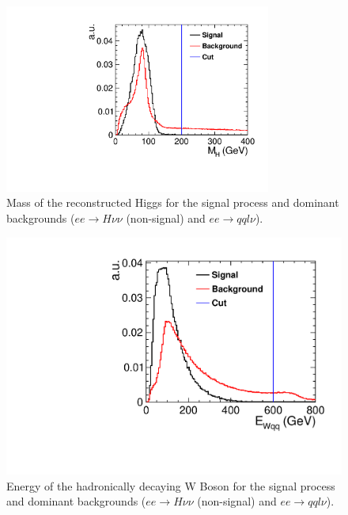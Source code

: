 \begin{figure}
  \centering
  \includegraphics[width=0.78\textwidth,keepaspectratio]{HiggsAnalysis/figures/PseudoHiggs_PreSelection}
  \caption[Reconstructed Higgs mass for signal and background events]{Mass of the reconstructed Higgs for the signal process and dominant backgrounds ($ee\rightarrow H\nu\nu$ (non-signal) and $ee\rightarrow qql\nu$).}
  \label{fig:HMassPreSel}
\end{figure}

\begin{figure}
  \centering
    \includegraphics[width=0.78\linewidth,keepaspectratio]{HiggsAnalysis/figures/EWqq_PreSelection}
    \caption[Energy of the hadronically decaying W Boson for signal and background events]{Energy of the hadronically decaying W Boson for the signal process and dominant backgrounds ($ee\rightarrow H\nu\nu$ (non-signal) and $ee\rightarrow qql\nu$).}
  \label{fig:WPreSel}
\end{figure}

